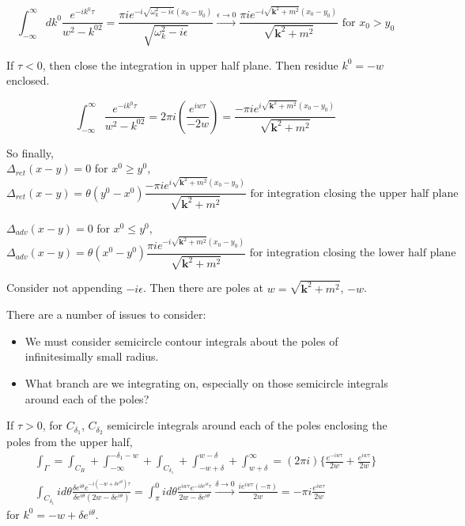\documentclass[twoside]{amsart}
\begin{document}
\[
\int_{-\infty}^{\infty} dk^0 \frac{ e^{-ik^0 \tau}}{ w^2 - k^{02} } = \frac{ \pi i e^{-i \sqrt{ \omega_k^2 - i \epsilon } (x_0 -y_0) } }{ \sqrt{ \omega_k^2 - i \epsilon } } \xrightarrow{ \epsilon \to 0} \frac{ \pi i e^{-i \sqrt{ \mathbf{k}^2 + m^2 } (x_0 - y_0) } }{ \sqrt{ \mathbf{k}^2 + m^2 } } \text{ for } x_0 > y_0 
\]

If $\tau <0$, then close the integration in upper half plane.  Then residue $k^0 = - w$ enclosed.  

\[
\int_{-\infty}^{\infty} \frac{ e^{-ik^0 \tau} }{ w^2 - k^{02}} = 2\pi i \left( \frac{ e^{iw \tau}}{ -2w} \right) = \frac{ - \pi i e^{ i \sqrt{ \mathbf{k}^2 + m^2  }(x_0 -y_0 )} }{ \sqrt{ \mathbf{k}^2 + m^2  }}
\]

So finally, \\
$\Delta_{ret}(x-y) = 0$ for $x^0 \geq y^0$, 
\[
\Delta_{ret}(x-y) = \theta(y^0 - x^0) \frac{ - \pi i e^{ i \sqrt{ \mathbf{k}^2 + m^2  }(x_0 -y_0 )} }{ \sqrt{ \mathbf{k}^2 + m^2  }} \text{ for integration closing the upper half plane }
\]

$\Delta_{adv}(x-y) = 0$ for $x^0 \leq y^0$, 
\[
\Delta_{adv}(x-y) = \theta(x^0 - y^0) \frac{  \pi i e^{ -i \sqrt{ \mathbf{k}^2 + m^2  }(x_0 -y_0 )} }{ \sqrt{ \mathbf{k}^2 + m^2  }} \text{ for integration closing the lower half plane }
\]


\hrulefill

Consider not appending $-i\epsilon$.  Then there are poles at $w = \sqrt{ \mathbf{k}^2 + m^2 }$, $-w$.  

There are a number of issues to consider:
\begin{itemize}
\item We must consider semicircle contour integrals about the poles of infinitesimally small radius.  
\item What branch are we integrating on, especially on those semicircle integrals around each of the poles?
\end{itemize}

If $\tau > 0$, for $C_{\delta_1}$, $C_{\delta_2}$ semicircle integrals around each of the poles enclosing the poles from the upper half, 
\[
\begin{gathered}
  \int_{\Gamma} = \int_{C_R} + \int_{-\infty}^{-\delta_1 - w} + \int_{C_{\delta_1}} + \int_{-w + \delta}^{w- \delta} + \int_{w+ \delta}^{\infty} = (2\pi i) \lbrace \frac{ e^{-iw\tau }  }{2w} + \frac{e^{i w \tau}}{ 2 w} \rbrace \\ 
  \int_{C_{\delta_1}} i d\theta \frac{ \delta e^{i \theta} e^{-i (-w + \delta e^{ i \theta} )\tau }}{ \delta e^{i \theta} (2w - \delta e^{i\theta} )} = \int_{\pi}^0 i d\theta \frac{ e^{i w \tau} e^{-i \delta e^{i\theta}  \tau } }{ 2w - \delta e^{i \theta} } \xrightarrow{ \delta \to 0 } \frac{ i e^{i w\tau} (- \pi )}{ 2w } = - \pi i \frac{ e^{i w \tau }}{2w } 
\end{gathered}
\]
for $k^0 = -w + \delta e^{i\theta}$.  
\end{document}
